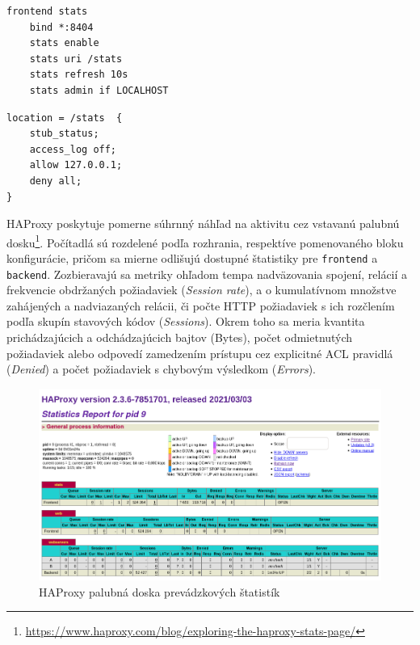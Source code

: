 \documentclass[12pt, a4paper]{article}
\begin{document}
\noindent\begin{minipage}{.48\textwidth}
\begin{lstlisting}[caption=HAProxy: štatistiky]
frontend stats
    bind *:8404
    stats enable
    stats uri /stats
    stats refresh 10s
    stats admin if LOCALHOST
\end{lstlisting}
\end{minipage}\hfill
\begin{minipage}{.48\textwidth}
\begin{lstlisting}[caption=NGINX: štatistiky]
location = /stats  {
    stub_status; 
    access_log off;
    allow 127.0.0.1;
    deny all;
}
\end{lstlisting}
\end{minipage}

HAProxy poskytuje pomerne súhrnný náhľad na aktivitu cez vstavanú palubnú dosku\footnote{
\url{https://www.haproxy.com/blog/exploring-the-haproxy-stats-page/}}.
Počítadlá sú rozdelené podľa rozhrania, respektíve pomenovaného bloku konfigurácie, pričom sa
mierne odlišujú dostupné štatistiky pre \verb|frontend| a \verb|backend|. Zozbieravajú sa metriky ohľadom 
tempa nadväzovania spojení, relácií a frekvencie obdržaných požiadaviek (\emph{Session rate}), a o 
kumulatívnom množstve zahájených a nadviazaných relácii, či počte HTTP požiadaviek s ich rozčlením podľa 
skupín stavových kódov (\emph{Sessions}). Okrem toho sa meria kvantita  prichádzajúcich a odchádzajúcich 
bajtov (Bytes), počet odmietnutých požiadaviek alebo odpovedí zamedzením prístupu cez explicitné ACL 
pravidlá (\emph{Denied}) a počet požiadaviek s chybovým výsledkom (\emph{Errors}). 

\begin{figure}[h]
  \centering
  \includegraphics[width=\textwidth]{images/HAProxyStats.png}
  \caption{HAProxy palubná doska prevádzkových štatistík}
\end{figure}
\end{document}
